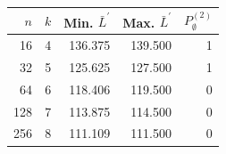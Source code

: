 \begin{tabular}{rrrrr}
\toprule
$n$ & $k$ & Min. $\bar L^\prime$ & Max. $\bar L^\prime$ & $P_{\emptyset}^{(2)}$ \\
\midrule
16 & 4 & 136.375 & 139.500 & 1 \\
32 & 5 & 125.625 & 127.500 & 1 \\
64 & 6 & 118.406 & 119.500 & 0 \\
128 & 7 & 113.875 & 114.500 & 0 \\
256 & 8 & 111.109 & 111.500 & 0 \\
\bottomrule
\end{tabular}